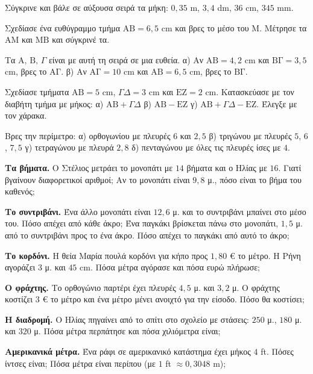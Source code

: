 \ex Σύγκρινε και βάλε σε αύξουσα σειρά τα μήκη: $0{,}35$ m, $3{,}4$ dm, $36$ cm, $345$ mm.

\ex Σχεδίασε ένα ευθύγραμμο τμήμα $\mathrm{ΑΒ}=6{,}5$ cm και βρες το μέσο του $\mathrm{Μ}$. Μέτρησε τα $\mathrm{ΑΜ}$ και $\mathrm{ΜΒ}$ και σύγκρινέ τα.

\ex Τα $\mathrm{Α},\,\mathrm{Β},\,\Gamma$ είναι με αυτή τη σειρά σε μια ευθεία. α) Αν $\mathrm{ΑΒ}=4{,}2$ cm και $\mathrm{ΒΓ}=3{,}5$ cm, βρες το $\mathrm{ΑΓ}$. β) Αν $\mathrm{ΑΓ}=10$ cm και $\mathrm{ΑΒ}=6{,}5$ cm, βρες το $\mathrm{ΒΓ}$.

\ex Σχεδίασε τμήματα $\mathrm{ΑΒ}=5$ cm, $\Gamma\Delta=3$ cm και $\mathrm{ΕΖ}=2$ cm. Κατασκεύασε με τον διαβήτη τμήμα με μήκος: α) $\mathrm{ΑΒ}+\Gamma\Delta$ \quad β) $\mathrm{ΑΒ}-\mathrm{ΕΖ}$ \quad γ) $\mathrm{ΑΒ}+\Gamma\Delta-\mathrm{ΕΖ}$. Έλεγξε με τον χάρακα.

\ex Βρες την περίμετρο: α) ορθογωνίου με πλευρές $6$ και $2{,}5$ \quad β) τριγώνου με πλευρές $5$, $6$, $7{,}5$ \quad γ) τετραγώνου με πλευρά $2{,}8$ \quad δ) πενταγώνου με όλες τις πλευρές ίσες με $4$.


\ex \textbf{Τα βήματα.} Ο Στέλιος μετράει το μονοπάτι με $14$ βήματα και ο Ηλίας με $16$. Γιατί βγαίνουν διαφορετικοί αριθμοί; Αν το μονοπάτι είναι $9{,}8$ μ., πόσο είναι το βήμα του καθενός;

\ex \textbf{Το συντριβάνι.} Ένα άλλο μονοπάτι είναι $12{,}6$ μ. και το συντριβάνι μπαίνει στο μέσο του. Πόσο απέχει από κάθε άκρο; Ένα παγκάκι βρίσκεται πάνω στο μονοπάτι, $1{,}5$ μ. από το συντριβάνι προς το ένα άκρο. Πόσο απέχει το παγκάκι από αυτό το άκρο;

\ex \textbf{Το κορδόνι.} Η θεία Μαρία πουλά κορδόνι για κήπο προς $1{,}80$ € το μέτρο. Η Ρήνη αγοράζει $3$ μ. και $45$ cm. Πόσα μέτρα αγόρασε και πόσα ευρώ πλήρωσε;

\ex \textbf{Ο φράχτης.} Το ορθογώνιο παρτέρι έχει πλευρές $4{,}5$ μ. και $3{,}2$ μ. Ο φράχτης κοστίζει $3$ € το μέτρο και ένα μέτρο μένει ανοιχτό για την είσοδο. Πόσο θα κοστίσει;

\ex \textbf{Η διαδρομή.} Ο Ηλίας πηγαίνει από το σπίτι στο σχολείο με στάσεις: $250$ μ., $180$ μ. και $320$ μ. Πόσα μέτρα περπάτησε και πόσα χιλιόμετρα είναι;

\ex \textbf{Αμερικανικά μέτρα.} Ένα ράφι σε αμερικανικό κατάστημα έχει μήκος $4$ ft. Πόσες ίντσες είναι; Πόσα μέτρα είναι περίπου (με $1$ ft $\approx0{,}3048$ m);


